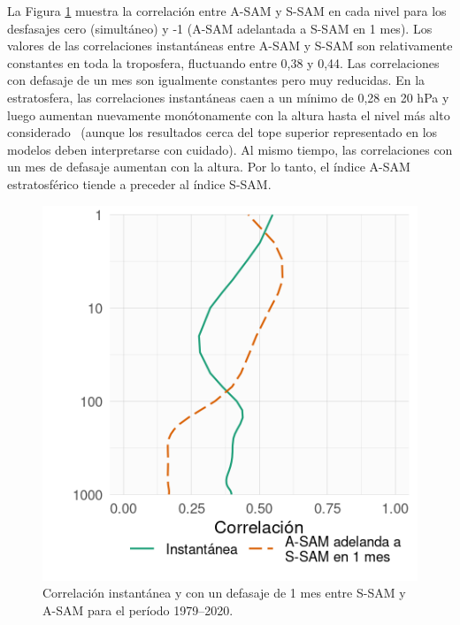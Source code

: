 \documentclass[12pt,oneside,a4paper]{reedthesis}
\begin{document}
La Figura \ref{fig:cor-lev} muestra la correlación entre A-SAM y S-SAM en cada nivel para los desfasajes cero (simultáneo) y -1 (A-SAM adelantada a S-SAM en 1 mes).
Los valores de las correlaciones instantáneas entre A-SAM y S-SAM son relativamente constantes en toda la troposfera, fluctuando entre 0,38 y 0,44.
Las correlaciones con defasaje de un mes son igualmente constantes pero muy reducidas.
En la estratosfera, las correlaciones instantáneas caen a un mínimo de 0,28 en 20 hPa y luego aumentan nuevamente monótonamente con la altura hasta el nivel más alto considerado~ (aunque los resultados cerca del tope superior representado en los modelos deben interpretarse con cuidado).
Al mismo tiempo, las correlaciones con un mes de defasaje aumentan con la altura.
Por lo tanto, el índice A-SAM estratosférico tiende a preceder al índice S-SAM.



\begin{figure}

{\centering \includegraphics{figures/30-sam/cor-lev-1} 

}

\caption{Correlación instantánea y con un defasaje de 1 mes entre S-SAM y A-SAM para el período 1979--2020.}\label{fig:cor-lev}
\end{figure}
\end{document}

